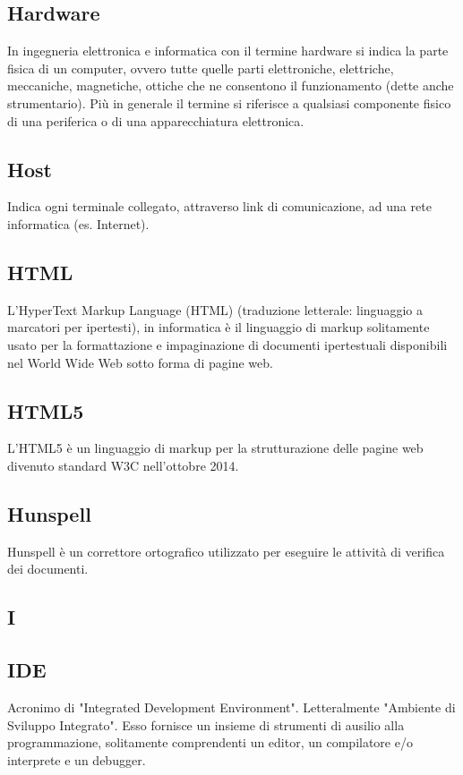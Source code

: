 \subsection{Hardware}
In ingegneria elettronica e informatica con il termine hardware si indica la parte fisica
di un computer, ovvero tutte quelle parti elettroniche, elettriche, meccaniche, magnetiche,
ottiche che ne consentono il funzionamento (dette anche strumentario). Più in generale il
termine si riferisce a qualsiasi componente fisico di una periferica o di una apparecchiatura
elettronica.

\subsection{Host}
Indica ogni terminale collegato, attraverso link di comunicazione, ad una rete informatica (es. Internet).

\subsection{HTML}
L'HyperText Markup Language (HTML) (traduzione letterale: linguaggio a marcatori per ipertesti), in informatica è il linguaggio di markup solitamente usato per la formattazione e impaginazione di documenti ipertestuali disponibili nel World Wide Web sotto forma di pagine web.

\subsection{HTML5}
L’HTML5 è un linguaggio di markup per la strutturazione delle pagine web divenuto
standard W3C nell’ottobre 2014.

\subsection{Hunspell}
Hunspell è un correttore ortografico utilizzato per eseguire le attività di verifica dei documenti.

\newpage

\begin{center}
\Huge\section{\uppercase{I}}
\end{center}

\subsection{IDE}
Acronimo di "Integrated Development Environment". Letteralmente "Ambiente
di Sviluppo Integrato". Esso fornisce un insieme di strumenti di ausilio
alla programmazione, solitamente comprendenti un editor, un compilatore e/o
interprete e un debugger.

